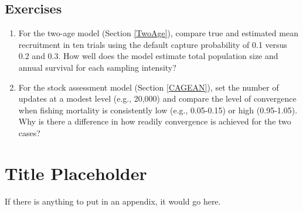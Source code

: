 \documentclass[
]{krantz}
\begin{document}
\hypertarget{exercises-7}{%
\section{Exercises}\label{exercises-7}}

\begin{enumerate}
\def\labelenumi{\arabic{enumi}.}
\item
  For the two-age model (Section \ref{TwoAge}), compare true and estimated mean recruitment in ten trials using the default capture probability of 0.1 versus 0.2 and 0.3. How well does the model estimate total population size and annual survival for each sampling intensity?
\item
  For the stock assessment model (Section \ref{CAGEAN}), set the number of updates at a modest level (e.g., 20,000) and compare the level of convergence when fishing mortality is consistently low (e.g., 0.05-0.15) or high (0.95-1.05). Why is there a difference in how readily convergence is achieved for the two cases?
\end{enumerate}

\cleardoublepage

\hypertarget{appendix-appendix}{%
\appendix {}}


\hypertarget{title-placeholder}{%
\chapter{Title Placeholder}\label{title-placeholder}}

If there is anything to put in an appendix, it would go here.

  

\backmatter
\printindex
\end{document}
